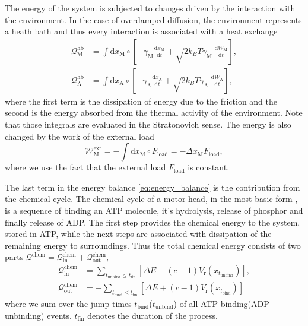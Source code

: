 \documentclass[aps,pre,twocolumn,showpacs,showkeys,superscriptaddress,floatfix]{revtex4-1}
\newcommand{\rmd}{{\mathrm d}}
\begin{document}
The energy of the system is subjected to changes driven by the interaction with the environment.
In the case of overdamped diffusion, the environment represents a heath bath
and thus every interaction is associated with a heat exchange \cite{Pesek2013}
\begin{align}
{\mathcal Q}_\text{M}^\text{hb} 
&= \int \rmd x_\text{M} \circ \left[ - \gamma_\text{M} \frac{\rmd x_\text{M} }{\rmd t} + \sqrt{ 2 k_B T \gamma_\text{M} } \, \frac{ \rmd W_\text{M} }{ \rmd t } \right] , 
\label{eq:heat_hb_M} \\
{\mathcal Q}_\text{A}^\text{hb} 
&= \int \rmd x_\text{A} \circ \left[ - \gamma_\text{A} \frac{\rmd x_\text{A} }{\rmd t} + \sqrt{ 2 k_B T \gamma_\text{A} } \, \frac{ \rmd W_\text{A} }{ \rmd t } \right] ,
\label{eq:heat_hb_A}
\end{align} 
where the first term is the dissipation of energy due to the friction and the second is the energy absorbed from the thermal activity of the environment.
Note that those integrals are evaluated in the Stratonovich sense.
The energy is also changed by the work of the external load 
\begin{equation}
{\mathcal W}^\text{ext}_\text{M} = - \int \rmd x_\text{M} \circ F_\text{load} = - \Delta x_\text{M} F_\text{load}, 
\label{eq:work_load}
\end{equation}
where we use the fact that the external load $F_\text{load}$ is constant. 

The last term in the energy balance \eqref{eq:energy_balance} is the contribution from the chemical cycle. 
The chemical cycle of a motor head, in the most basic form \cite{astumian1996mechanochemical,Bierbaum2011,Bierbaum2013,albert2014stochastic}, is a sequence of binding an ATP molecule, it's hydrolysis, release of phosphor and finally release of ADP.
The first step provides the chemical energy to the system, stored in ATP, while the next steps are associated with dissipation of the remaining energy to surroundings.
Thus the total chemical energy consists of two parts ${\mathcal Q}^\text{chem} = {\mathcal Q}^\text{chem}_\text{in} + {\mathcal Q}^\text{chem}_\text{out}$,
\begin{align}
{\mathcal Q}_\text{in}^\text{chem} 
&= \sum_{t_\text{unbind} \leq t_\text{fin} } \left[ \Delta E + (c-1) V_\text{r}(x_{t_\text{unbind}}) \right] , 
\label{eq:q_in} \\
{\mathcal Q}_\text{out}^\text{chem} 
&= -\sum_{t_\text{bind} \leq t_\text{fin} } \left[ \Delta E + (c-1) V_\text{r}(x_{t_\text{bind}}) \right] 
\label{eq:q_out}
\end{align}
where we sum over the jump times $t_\text{bind}$($t_\text{unbind}$) of all ATP binding(ADP unbinding) events.
$t_\text{fin}$ denotes the duration of the process. 
\end{document}
